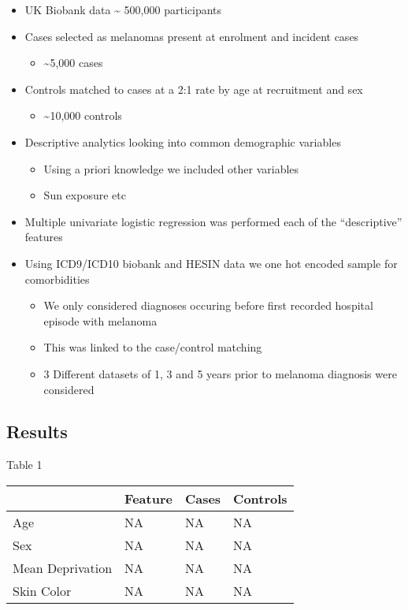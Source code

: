\documentclass[
]{article}
\providecommand{\tightlist}{%
  \setlength{\itemsep}{0pt}\setlength{\parskip}{0pt}}
\begin{document}
\begin{itemize}
\tightlist
\item
  UK Biobank data \textasciitilde{} 500,000 participants
\item
  Cases selected as melanomas present at enrolment and incident cases

  \begin{itemize}
  \tightlist
  \item
    \textasciitilde5,000 cases
  \end{itemize}
\item
  Controls matched to cases at a 2:1 rate by age at recruitment and sex

  \begin{itemize}
  \tightlist
  \item
    \textasciitilde10,000 controls
  \end{itemize}
\item
  Descriptive analytics looking into common demographic variables

  \begin{itemize}
  \tightlist
  \item
    Using a priori knowledge we included other variables
  \item
    Sun exposure etc
  \end{itemize}
\item
  Multiple univariate logistic regression was performed each of the
  ``descriptive'' features
\item
  Using ICD9/ICD10 biobank and HESIN data we one hot encoded sample for
  comorbidities

  \begin{itemize}
  \tightlist
  \item
    We only considered diagnoses occuring before first recorded hospital
    episode with melanoma
  \item
    This was linked to the case/control matching
  \item
    3 Different datasets of 1, 3 and 5 years prior to melanoma diagnosis
    were considered
  \end{itemize}
\end{itemize}

\hypertarget{results}{%
\subsection{Results}\label{results}}

Table 1

\begin{longtable}[]{@{}llll@{}}
\toprule
& Feature & Cases & Controls\tabularnewline
\midrule
\endhead
Age & NA & NA & NA\tabularnewline
Sex & NA & NA & NA\tabularnewline
Mean Deprivation & NA & NA & NA\tabularnewline
Skin Color & NA & NA & NA\tabularnewline
\bottomrule
\end{longtable}
\end{document}
